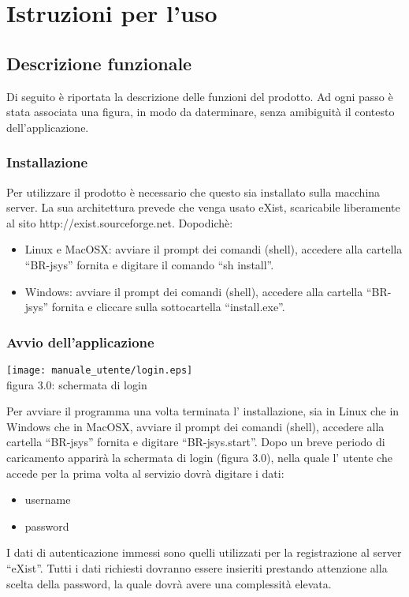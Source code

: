 \chapter{Istruzioni per l'uso}
\section{Descrizione funzionale}
Di seguito \`e riportata la descrizione delle funzioni del prodotto. Ad ogni passo \`e stata associata una figura, in modo da daterminare, senza amibiguit\`a il contesto dell'applicazione.
\subsection{Installazione}
Per utilizzare il prodotto \`e necessario che questo sia installato sulla macchina server. La sua architettura prevede che venga usato eXist, scaricabile liberamente al sito http://exist.sourceforge.net. Dopodich\`e:
\begin{itemize}
\item Linux e MacOSX: avviare il prompt dei comandi (shell), accedere alla cartella ``BR-jsys'' fornita e digitare il comando ``sh install''.
\item Windows: avviare il prompt dei comandi (shell), accedere alla cartella ``BR-jsys'' fornita e cliccare sulla sottocartella ``install.exe''.
\end{itemize}
\subsection{Avvio dell'applicazione}
\begin{center}
\texttt{[image: manuale\_utente/login.eps]}\\
 figura 3.0: schermata di login
\end{center}
Per avviare il programma una volta terminata l' installazione, sia in Linux che in Windows che in MacOSX, avviare il prompt dei comandi (shell), accedere alla cartella ``BR-jsys'' fornita e digitare ``BR-jsys.start''. Dopo un breve periodo di caricamento apparir\`a la schermata di login (figura 3.0), nella quale l' utente che accede per la prima volta al servizio dovr\`a digitare i dati: 
\begin{itemize}
\item username
\item password
\end{itemize}
I dati di autenticazione immessi sono quelli utilizzati per la registrazione al server ``eXist''. Tutti i dati richiesti dovranno essere insieriti prestando attenzione alla scelta della password, la quale dovr\`a avere una complessit\`a elevata. 
